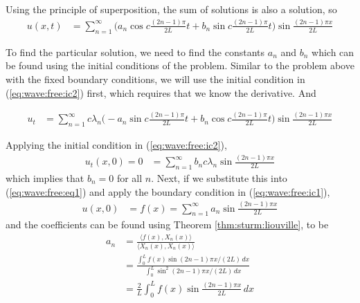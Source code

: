Using the principle of superposition, the sum of solutions is also a solution, so
%
\begin{align} \label{eq:wave:free:eq1}
u(x,t) & = \sum_{n=1}^{\infty} \biggl(a_n \cos c \frac{(2n-1)\pi}{2L} t + b_n \sin c \frac{(2n-1)\pi}{2L} t \biggr) \sin \frac{(2n-1)\pi x}{2L}
\end{align}

To find the particular solution, we need to find the constants $a_n$ and $b_n$ which can be found using the initial conditions of the problem.  Similar to the problem above with the fixed boundary conditions, we will use the initial condition in (\ref{eq:wave:free:ic2}) first, which requires that we know the derivative.  And

\begin{align*}
u_t & = \sum_{n=1}^{\infty} c \lambda_n \biggl(-a_n \sin c \frac{(2n-1)\pi}{2L} t + b_n \cos c \frac{(2n-1)\pi}{2L} t \biggr) \sin \frac{(2n-1)\pi x}{2L}
\end{align*}

Applying the initial condition in (\ref{eq:wave:free:ic2}),
\begin{align*}
u_t(x,0)=0 & = \sum_{n=1}^{\infty}b_n c \lambda_n  \sin \frac{(2n-1)\pi x}{2L}
\end{align*}
which implies that $b_n=0$ for all $n$.  Next, if we substitute this into (\ref{eq:wave:free:eq1}) and apply the boundary condition in (\ref{eq:wave:free:ic1}),
%
\begin{align*}
u(x,0) & = f(x) = \sum_{n=1}^{\infty} a_n \sin \frac{(2n-1)\pi x}{2L}
\end{align*}
and the coefficients can be found using Theorem \ref{thm:sturm:liouville}, to be
%
\begin{align*}
a_n & = \frac{\langle f(x), X_n(x) \rangle}{\langle X_n(x), X_n(x) \rangle} \\
& = \frac{\int_0^L f(x) \sin (2n-1)\pi x/(2L) \, dx }{\int_0^L \sin^2 (2n-1)\pi x/(2L) \, dx } \\
& = \frac{2}{L} \int_0^L f(x) \sin  \frac{(2n-1)\pi x}{2L} \, dx
\end{align*}

